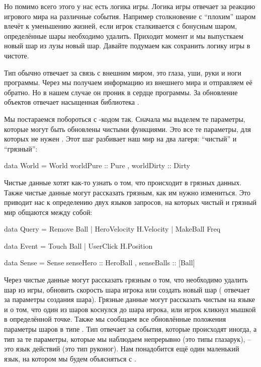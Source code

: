 Но помимо всего этого у нас есть логика игры. Логика игры отвечает за
реакцию игрового мира на различные события. Например столкновение с
``плохим'' шаром влечёт к уменьшению жизней, если игрок сталкивается с
бонусным шаром, определённые шары необходимо удалить. Приходит момент и
мы выпусткаем новый шар из лузы новый шар. Давайте подумаем как
сохранить логику игры в чистоте.

Тип  обычно отвечает за связь с внешним миром, это глаза, уши,
руки и ноги программы. Через  мы получаем информацию из внешнего
мира и отправляем её обратно. Но в нашем случае он проник в сердце
программы. За обновление объектов отвечает насыщенная  библиотека
.

Мы постараемся побороться с -кодом так. Сначала мы выделем те
параметры, которые могут быть обновлены чистыми функциями. Это все те
параметры, для которых не нужен . Этот шаг разбивает наш мир
на два лагеря: ``чистый'' и ``грязный'':


\begin{code}
data World = World 
    { worldPure   :: Pure
    , worldDirty  :: Dirty }
\end{code}

Чистые данные хотят как-то узнать о том, что происходит в грязных
данных. Также чистые данные могут рассказать грязным, как им нужно
измениться. Это приводит нас к определению двух языков запросов, на
которых чистый и грязный мир общаются между собой:


\begin{code}
data Query = Remove Ball | HeroVelocity H.Velocity | MakeBall Freq

data Event = Touch Ball | UserClick H.Position

data Sense = Sense 
    { senseHero     :: HeroBall
    , senseBalls    :: [Ball]  }
\end{code}

Через  чистые данные могут рассказать грязным о том, что
необходимо удалить шар из игры, обновить скорость шара игрока или
создать новый шар ( отвечает за параметры создания шара).
Грязные данные могут рассказать чистым на языке  и 
о том, что один из шаров коснулся до шара игрока, или игрок кликнул
мышкой в определённой точке. Также мы сообщаем все обновлённые положения
параметры шаров в типе . Тип  отвечает за события,
которые происходят иногда, а тип  за те параметры, которые мы
наблюдаем непрерывно (это типы глазарук),  -- это язык
действий (это тип руконог). Нам понадобится ещё один маленький язык, на
котором мы будем объясняться с .



